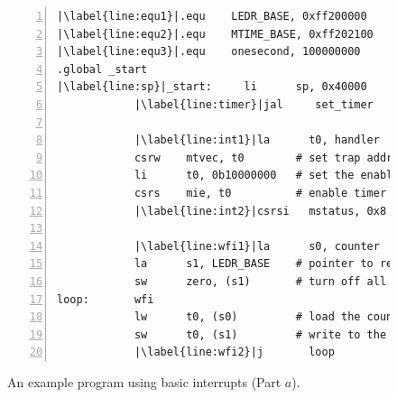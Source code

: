 \documentclass[11pt, twoside, pdftex]{article}
\begin{document}
\begin{figure}[h]
\begin{center} \begin{minipage}[h]{15 cm}
\begin{lstlisting}[style=defaultNiosVStyle, name=ints, numbers=left, escapechar=|]
|\label{line:equ1}|.equ    LEDR_BASE, 0xff200000
|\label{line:equ2}|.equ    MTIME_BASE, 0xff202100
|\label{line:equ3}|.equ    onesecond, 100000000
.global _start
|\label{line:sp}|_start:     li      sp, 0x40000      # initialize the stack location
            |\label{line:timer}|jal     set_timer        # initialize the timer
     
            |\label{line:int1}|la      t0, handler
            csrw    mtvec, t0        # set trap address
            li      t0, 0b10000000   # set the enable pattern
            csrs    mie, t0          # enable timer interrupts
            |\label{line:int2}|csrsi   mstatus, 0x8     # enable global interrupts

            |\label{line:wfi1}|la      s0, counter      # pointer to counter
            la      s1, LEDR_BASE    # pointer to red lights
            sw      zero, (s1)       # turn off all lights
loop:       wfi
            lw      t0, (s0)         # load the counter value
            sw      t0, (s1)         # write to the lights
            |\label{line:wfi2}|j       loop
\end{lstlisting}
	\caption{An example program using basic interrupts (Part $a$).}
	\label{fig:ints}
\end{minipage}
\end{center}
\end{figure}
\end{document}
